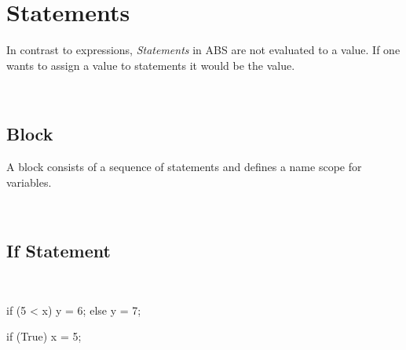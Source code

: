 \chapter{Statements}
In contrast to expressions, \emph{Statements} in ABS are not
evaluated to a value. If one wants to assign a value to statements
it would be the  value.

\begin{abssyntax}
     {}
                 {}
                 {}
                 {}
                 {}
                 {}
                 {}
                 {}
                 {}
                 {}\\
  {}
                 {}
                 {}
\end{abssyntax}

\section{Block}
A block consists of a sequence of statements and defines a name scope for variables.



\begin{abssyntax}
  \TRS{\{}\ \ \TRS{\}}
\end{abssyntax}

\section{If Statement}

\begin{abssyntax}
  {}\ \TRS{(}  \TRS{)}\  
\end{abssyntax}

\begin{absexample}
if (5 < x) {
  y = 6;
} else {
  y = 7;
}

if (True)
  x = 5;
\end{absexample}

